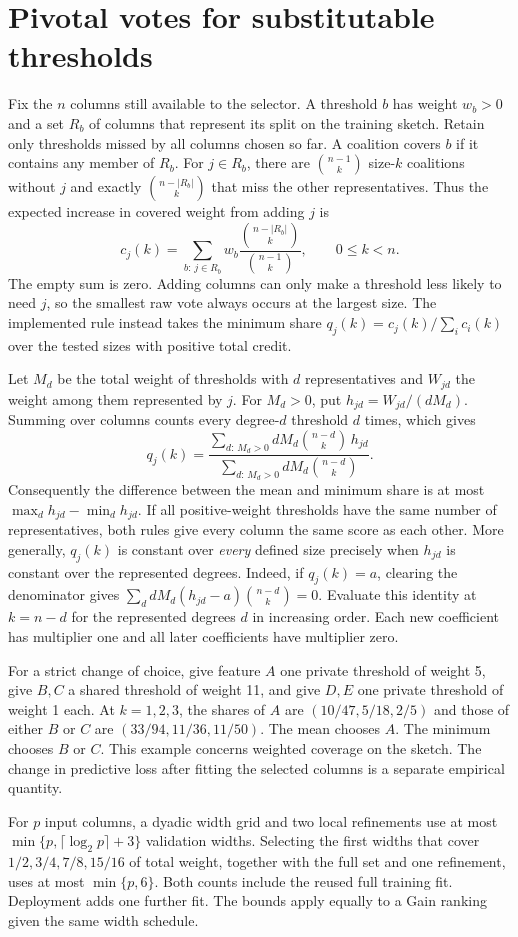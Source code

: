 \section*{Pivotal votes for substitutable thresholds}
Fix the $n$ columns still available to the selector. A threshold $b$ has weight
$w_b>0$ and a set $R_b$ of columns that represent its split on the training
sketch. Retain only thresholds missed by all columns chosen so far.
A coalition covers $b$ if it contains any member of $R_b$. For $j\in R_b$,
there are $\binom{n-1}{k}$ size-$k$ coalitions without $j$ and exactly
$\binom{n-|R_b|}{k}$ that miss the other representatives. Thus the expected
increase in covered weight from adding $j$ is
\[
 c_j(k)=\sum_{b:\,j\in R_b}w_b
 \frac{\binom{n-|R_b|}{k}}{\binom{n-1}{k}},
 \qquad 0\leq k<n .
\]
The empty sum is zero. Adding columns can only make a threshold less likely
to need $j$, so the smallest raw vote always occurs at the largest size.
The implemented rule instead takes the minimum share
$q_j(k)=c_j(k)/\sum_i c_i(k)$ over the tested sizes with positive total credit.

Let $M_d$ be the total weight of thresholds with $d$ representatives and
$W_{jd}$ the weight among them represented by $j$. For $M_d>0$, put
$h_{jd}=W_{jd}/(dM_d)$. Summing over columns counts every degree-$d$ threshold
$d$ times, which gives
\[
 q_j(k)=
 \frac{\sum_{d:\,M_d>0} dM_d\binom{n-d}{k}\,h_{jd}}
      {\sum_{d:\,M_d>0} dM_d\binom{n-d}{k}} .
\]
Consequently the difference between the mean and minimum share is at most
$\max_d h_{jd}-\min_d h_{jd}$. If all positive-weight thresholds have the same
number of representatives, both rules give every column the same score as
each other. More generally, $q_j(k)$ is constant over \emph{every} defined
size precisely when $h_{jd}$ is constant over the represented degrees.
Indeed, if $q_j(k)=a$, clearing the denominator gives
$\sum_d dM_d(h_{jd}-a)\binom{n-d}{k}=0$. Evaluate this identity at $k=n-d$
for the represented degrees $d$ in increasing order. Each new coefficient has
multiplier one and all later coefficients have multiplier zero.

For a strict change of choice, give feature $A$ one private threshold of
weight 5, give $B,C$ a shared threshold of weight 11, and give $D,E$ one
private threshold of weight 1 each. At $k=1,2,3$, the shares of $A$ are
$(10/47,5/18,2/5)$ and those of either $B$ or $C$ are
$(33/94,11/36,11/50)$. The mean chooses $A$. The minimum chooses $B$ or $C$.
This example concerns weighted coverage on the sketch. The change in predictive
loss after fitting the selected columns is a separate empirical quantity.

For $p$ input columns, a dyadic width grid and two local refinements use at
most $\min\{p,\lceil\log_2 p\rceil+3\}$ validation widths. Selecting the
first widths that cover $1/2,3/4,7/8,15/16$ of total weight, together with
the full set and one refinement, uses at most $\min\{p,6\}$. Both counts
include the reused full training fit. Deployment adds one further fit.
The bounds apply equally to a Gain ranking given the same width schedule.
